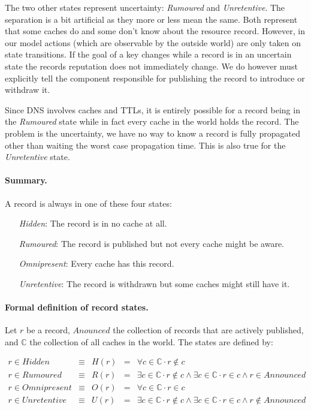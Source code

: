 \documentclass[twoside,english, a4paper]{article}
\begin{document}
The two other states represent uncertainty: \emph{Rumoured} and \emph
{Unretentive}. The separation is a bit artificial as they more or less 
mean the same. Both represent that some caches do and some don't 
know about the resource record. However, in our model actions (which 
are observable by the outside world) are only taken on state 
transitions. If the goal of a key changes while a record is in an 
uncertain state the records reputation does not immediately change. We 
do however must explicitly tell the component responsible for 
publishing the record to introduce or withdraw it. 

Since DNS involves caches and TTLs, it is entirely possible for a 
record being in the \emph{Rumoured} state while in fact every cache 
in the world holds the record. The problem is the uncertainty, we have
no way to know a record is fully propagated other than waiting the
worst case propagation time. This is also true for the \emph{Unretentive}
state.

\paragraph{Summary.} A record is always in one of these four states:

\begin{itemize}
       \item[\emph{Hidden}:] 		
			The record is in no cache at all.
       \item[\emph{Rumoured}:] 		
			The record is published but not every cache might be aware.
\item[\emph{Omnipresent}:]
			Every cache has this record.
\item[\emph{Unretentive}:]
			The record is withdrawn but some caches might still have it.
\end{itemize} 

\paragraph{Formal definition of record states.} Let $r$ be a record, $Anounced$ the 
collection of records that are actively published, and $\mathbb{C}$
the collection of all caches in the world. The states are defined by:

\begin{displaymath}
\begin{array}{lllll}
       r\in Hidden      & \equiv & H(r) &=& \forall c \in \mathbb{C} \cdot r \not \in c \\
       r\in Rumoured    & \equiv & R(r) &=& \exists c \in \mathbb{C} \cdot r \not \in c \wedge \exists c \in \mathbb{C} \cdot r\in c \wedge r\in Announced\\
       r\in Omnipresent & \equiv & O(r) &=& \forall c \in \mathbb{C} \cdot r \in c \\
       r\in Unretentive    & \equiv & U(r) &=& \exists c \in \mathbb{C} \cdot r \not \in c \wedge \exists c \in \mathbb{C} \cdot r \in c \wedge r \notin Announced \\
\end{array}
\end{displaymath}
\end{document}
